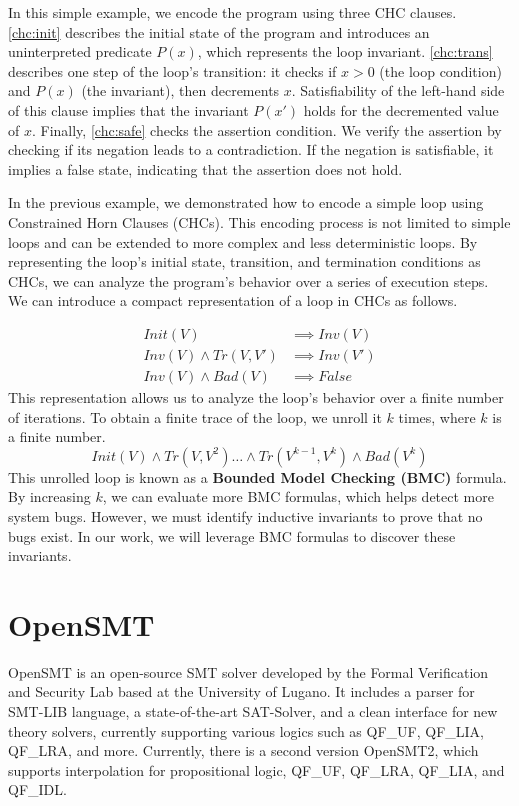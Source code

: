 In this simple example, we encode the program using three CHC clauses. \eqref{chc:init} describes the initial state of the program and introduces an
uninterpreted predicate $P(x)$, which represents the loop invariant. \eqref{chc:trans} describes one step of the loop's transition: it checks if $x>0$
(the loop condition) and $P(x)$ (the invariant), then decrements $x$.
Satisfiability of the left-hand side of this clause implies that the invariant
$P(x')$ holds for the decremented value of $x$. Finally, \eqref{chc:safe}
checks the assertion condition. We verify the assertion by checking if its negation
leads to a contradiction. If the negation is satisfiable, it
implies a false state, indicating that the assertion does not hold.

In the previous example, we demonstrated how to encode a simple loop using
Constrained Horn Clauses (CHCs). This encoding process is not limited to simple
loops and can be extended to more complex and less deterministic loops. By
representing the loop’s initial state, transition, and termination conditions
as CHCs, we can analyze the program's behavior over a series of execution
steps. We can introduce a compact representation of a loop in CHCs as follows.

\vspace{\baselineskip}
\begin{equation}
    \begin{aligned}
        Init(V) &\implies Inv(V) \\
        Inv(V) \land Tr(V, V') &\implies Inv(V') \\
        Inv(V) \land Bad(V) &\implies False
    \end{aligned}
\end{equation}
This representation allows us to analyze the loop's behavior over a finite number of iterations. To obtain a finite trace of the loop, we unroll it $k$ times, where $k$ is a finite number.
\vspace{\baselineskip}
\begin{equation}
    Init(V) \land Tr(V, V^2) \dots \land Tr(V^{k-1}, V^k) \land Bad(V^k)
\end{equation}
This unrolled loop is known as a \textbf{Bounded Model Checking (BMC)} formula.
By increasing $k$, we can evaluate more BMC formulas, which helps detect more system bugs. However, we must identify inductive invariants to prove that no bugs exist. In our work, we will leverage BMC formulas to discover
these invariants.


\section{OpenSMT}
\noindent OpenSMT\cite{10.1007/978-3-642-12002-2_12} is an open-source SMT solver developed by the Formal Verification and Security Lab based at the University of Lugano. It includes a parser for SMT-LIB\cite{BarFT-SMTLIB} language, a state-of-the-art SAT-Solver, and a clean interface for new theory solvers, currently supporting various logics such as QF\_UF, QF\_LIA, QF\_LRA, and more. Currently, there is a second version OpenSMT2\cite{10.1007/978-3-319-40970-2_35}, which supports interpolation for propositional logic, QF\_UF, QF\_LRA, QF\_LIA, and QF\_IDL.

